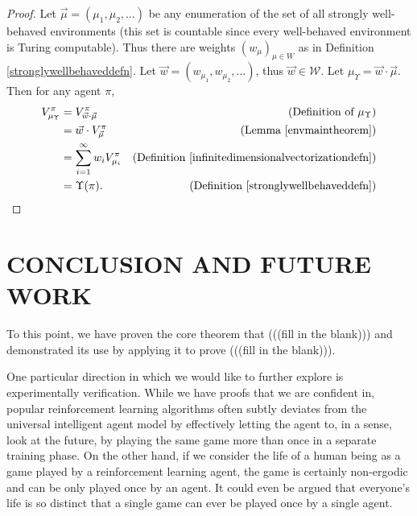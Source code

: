 \documentclass[twoside]{article}
\begin{document}
\begin{proof}
    Let $\vec\mu=(\mu_1,\mu_2,\ldots)$ be any enumeration of the set of all
    strongly well-behaved environments (this set is countable since every
    well-behaved environment is Turing computable).
    Thus there are weights $(w_\mu)_{\mu\in W}$ as in Definition \ref{stronglywellbehaveddefn}.
    Let $\vec w=(w_{\mu_1},w_{\mu_2},\ldots)$,
    thus $\vec w\in\mathscr W$.
    Let $\mu_\Upsilon=\vec w\cdot \vec\mu$. Then for any agent $\pi$,
    \begin{align*}
        V^\pi_{\mu_\Upsilon}
            &= V^\pi_{\vec w\cdot \vec\mu}
                &\mbox{(Definition of $\mu_\Upsilon$)}\\
            &= \vec w\cdot V^\pi_{\vec\mu}
                &\mbox{(Lemma \ref{envmaintheorem})}\\
            &= \sum_{i=1}^\infty w_i V^\pi_{\mu_i}
                &\mbox{(Definition \ref{infinitedimensionalvectorizationdefn})}\\
            &= \Upsilon(\pi).
                &\mbox{(Definition \ref{stronglywellbehaveddefn})}
    \end{align*}
\end{proof}

\section{CONCLUSION AND FUTURE WORK}

To this point, we have proven the core theorem that
(((fill in the blank)))
and demonstrated its use by applying it to prove
(((fill in the blank))).

One particular direction in which we would like to further explore is experimentally verification.
While we have proofs that we are confident in, popular reinforcement learning algorithms often subtly deviates from
the universal intelligent agent model by effectively letting the agent to, in a sense, look at the future, by playing the same game more than once in a separate training phase.
On the other hand, if we consider the life of a human being as a game played by a reinforcement learning agent,
the game is certainly non-ergodic and can be only played once by an agent. It could even be argued that everyone's life is so distinct that a single game can ever be played once by a single agent.
\end{document}
